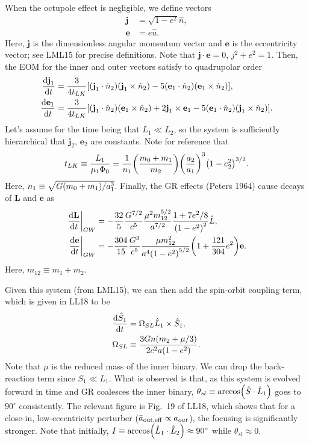 \documentclass[11pt,
        usenames, %
        dvipsnames %
    ]{article}
\newcommand*{\rd}[2]{\frac{\mathrm{d}#1}{\mathrm{d}#2}}
\newcommand*{\bm}[1]{\boldsymbol{\mathbf{#1}}}
\newcommand*{\at}[1]{\left.#1\right|}
\DeclarePairedDelimiter\p{\lparen}{\rparen}
\DeclarePairedDelimiter\s{\lbrack}{\rbrack}
\begin{document}
When the octupole effect is negligible, we define vectors
\begin{align}
    \bm{j} &= \sqrt{1 - e^2}\hat{n},\\
    \bm{e} &= e\hat{u}.
\end{align}
Here, $\bm{j}$ is the dimensionless angular momentum vector and $\bm{e}$ is the
eccentricity vector; see LML15 for precise definitions. Note that $\bm{j} \cdot
\bm{e} = 0$, $j^2 + e^2 = 1$. Then, the EOM for the inner and outer vectors
satisfy to quadrupolar order
\begin{align}
    \rd{\bm{j}_1}{t} &= \frac{3}{4t_{LK}} \s*{
        \p*{\bm{j}_1 \cdot \hat{n}_2} \p*{\bm{j}_1 \times \hat{n}_2}
        - 5\p*{\bm{e}_1 \cdot \hat{n}_2}\p*{\bm{e}_1 \times \hat{n}_2}
        },\\
    \rd{\bm{e}_1}{t} &= \frac{3}{4t_{LK}} \s*{
        \p*{\bm{j}_1 \cdot \hat{n}_2} \p*{\bm{e}_1 \times \hat{n}_2}
        + 2\bm{j}_1 \times \bm{e}_1
        - 5\p*{\bm{e}_1 \cdot \hat{n}_2}\p*{\bm{j}_1 \times \hat{n}_2}
        }.
\end{align}
Let's assume for the time being that $L_1 \ll L_2$, so the system is
sufficiently hierarchical that $\bm{j}_2$, $\bm{e}_2$ are constants. Note for
reference that
\begin{equation}
    t_{LK} \equiv \frac{L_1}{\mu_1 \Phi_0}
        = \frac{1}{n_1}\p*{\frac{m_0 + m_1}{m_2}}
            \p*{\frac{a_2}{a_1}}^3
            \p*{1 - e_2^2}^{3/2}.
\end{equation}
Here, $n_1 \equiv \sqrt{G\p*{m_0 + m_1}/a_1^3}$. Finally, the GR effects
(Peters 1964) cause decays of $\bm{L}$ and $\bm{e}$ as
\begin{align}
    \at{\rd{\bm{L}}{t}}_{GW} &= -\frac{32}{5}\frac{G^{7/2}}{c^5}
        \frac{\mu^2 m_{12}^{5/2}}{a^{7/2}}
        \frac{1 + 7e^2/8}{\p*{1 - e^2}^2}\hat{L},\\
    \at{\rd{\bm{e}}{t}}_{GW} &= -\frac{304}{15} \frac{G^3}{c^5}
        \frac{\mu m_{12}^2}{a^4\p*{1 - e^2}^{5/2}}\p*{1 + \frac{121}{304}
            e^2}\bm{e}.
\end{align}
Here, $m_{12} \equiv m_1 + m_2$.

Given this system (from LML15), we can then add the spin-orbit coupling term,
which is given in LL18 to be
\begin{align}
    \rd{\hat{S}_1}{t} &= \Omega_{SL}\hat{L}_1 \times \hat{S}_1,\\
    \Omega_{SL} &\equiv \frac{3Gn\p*{m_2 + \mu/3}}{2c^2a\p*{1 - e^2}}.
\end{align}
Note that $\mu$ is the reduced mass of the inner binary. We can drop the
back-reaction term since $S_1 \ll L_1$. What is observed is that, as this system
is evolved forward in time and GR coalesces the inner binary, $\theta_{sl}
\equiv \arccos\p*{\hat{S} \cdot \hat{L}_1}$ goes to $90^\circ$ consistently. The
relevant figure is Fig.~19 of LL18, which shows that for a close-in,
low-eccentricity perturber ($\bar{a}_{\rm out, eff} \propto a_{out}$), the
focusing is significantly stronger. Note that initially, $I \equiv
\arccos\p*{\hat{L}_1 \cdot \hat{L}_2} \approx 90^\circ$ while $\theta_{sl}
\approx 0$.
\end{document}
